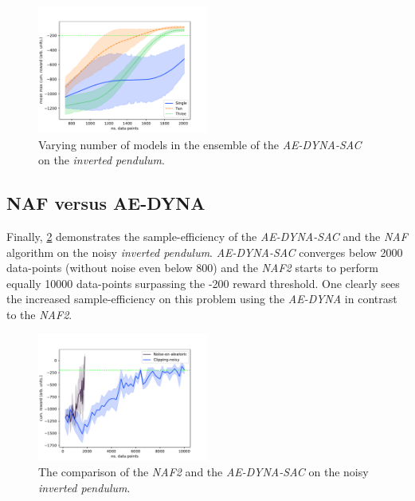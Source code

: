 \documentclass[
reprint,
amsmath,amssymb,amsfonts,clevref,
aps,
prstab,
]{revtex4-2}
\begin{document}
\begin{figure}
	\centering
	\includegraphics*[width=0.5\textwidth]{Figures/Comparison_models_sizes}
	\caption{Varying number of models in the ensemble of the \emph{AE-DYNA-SAC} on the \emph{inverted pendulum}.}
	\label{fig:Compare_models_sizes}
\end{figure}
\subsection{NAF versus AE-DYNA}
	Finally, \cref{fig:comparsion_NAF_AE-DYNA} demonstrates the sample-efficiency of the \emph{AE-DYNA-SAC} and the \emph{NAF} algorithm on the noisy \emph{inverted pendulum}. \emph{AE-DYNA-SAC} converges below 2000 data-points (without noise even below 800) and the \emph{NAF2} starts to perform equally 10000 data-points surpassing the -200 reward threshold. One clearly sees the increased sample-efficiency on this problem using the \emph{AE-DYNA} in contrast to the \emph{NAF2}.
\begin{figure}
	\centering
	\includegraphics*[width=0.5\textwidth]{Figures/Comparison_NAF_AE-DYNA}
	\caption{The comparison of the \emph{NAF2} and the \emph{AE-DYNA-SAC} on the noisy \emph{inverted pendulum}.}
	\label{fig:comparsion_NAF_AE-DYNA}
\end{figure}
\end{document}
